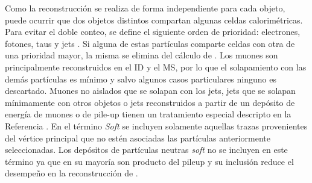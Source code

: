 Como la reconstrucción se realiza de forma independiente para cada objeto, puede ocurrir que dos objetos distintos compartan algunas celdas calorimétricas. Para evitar el doble conteo, se define el siguiente orden de prioridad: electrones, fotones, taus y jets \cite{PERF-2011-07, PERF-2014-04}. Si alguna de estas partículas comparte celdas con otra de una prioridad mayor, la misma se elimina del cálculo de \met. Los muones son principalmente reconstruidos en el ID y el MS, por lo que el solapamiento con las demás partículas es mínimo y salvo algunos casos particulares ninguno es descartado. Muones no aislados que se solapan con los jets, jets que se solapan mínimamente con otros objetos o jets reconstruidos a partir de un depósito de energía de muones o de pile-up tienen un tratamiento especial descripto en la Referencia \cite{PERF-2016-07}. En el término \textit{Soft} se incluyen solamente aquellas trazas provenientes del vértice principal que no estén asociadas las partículas anteriormente seleccionadas. Los depósitos de partículas neutras \textit{soft} no se incluyen en este término ya que en su mayoría son producto del pileup y su inclusión reduce el desempeño en la reconstrucción de \met.





